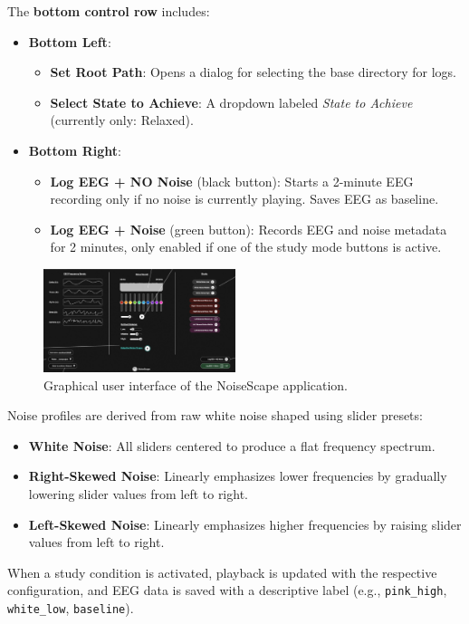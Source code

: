 The \textbf{bottom control row} includes:
\begin{itemize}
\item \textbf{Bottom Left}:
\begin{itemize}
\item \textbf{Set Root Path}: Opens a dialog for selecting the base directory for logs.
\item \textbf{Select State to Achieve}: A dropdown labeled \textit{State to Achieve} (currently only: Relaxed).
\end{itemize}
\item \textbf{Bottom Right}:
\begin{itemize}
\item \textbf{Log EEG + NO Noise} (black button): Starts a 2-minute EEG recording only if no noise is currently playing. Saves EEG as baseline.
\item \textbf{Log EEG + Noise} (green button): Records EEG and noise metadata for 2 minutes, only enabled if one of the study mode buttons is active.
\end{itemize}
\end{itemize}

\begin{figure}[H]
\centering
\includegraphics[width=0.5\textwidth]{interface.png}
\caption{Graphical user interface of the NoiseScape application.}
\end{figure}


Noise profiles are derived from raw white noise shaped using slider presets:

\begin{itemize}
\item \textbf{White Noise}: All sliders centered to produce a flat frequency spectrum.
\item \textbf{Right-Skewed Noise}: Linearly emphasizes lower frequencies by gradually lowering slider values from left to right.
\item \textbf{Left-Skewed Noise}: Linearly emphasizes higher frequencies by raising slider values from left to right.
\end{itemize}

When a study condition is activated, playback is updated with the respective configuration, and EEG data is saved with a descriptive label (e.g., \texttt{pink\_high}, \texttt{white\_low}, \texttt{baseline}).

